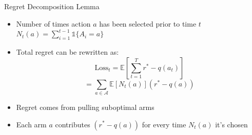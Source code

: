 \documentclass[11pt,table]{beamer}
\begin{document}
\begin{frame}{Regret Decomposition Lemma}
\begin{itemize}
  \item Number of times action $a$ has been selected prior to time $t$ $N_t(a)=\sum_{i=1}^{t-1} \mathds{1} \{A_i = a\}$ 
  \item Total regret can be rewritten as:
  \[
  \text{Loss}_t = \mathbb{E}\left[ \sum_{t=1}^{T} r^* - q(a_t) \right] 
  \]
  \[
  = \sum_{a \in \mathcal{A}} \mathbb{E}[N_t(a)]  (r^* - q(a)) 
  \]
\end{itemize}
\begin{itemize}
	\item Regret comes from pulling suboptimal arms
	\item Each arm $a$ contributes $(r^* - q(a))$ for every time $N_t(a)$ it's chosen
\end{itemize}
\end{frame}
\end{document}

